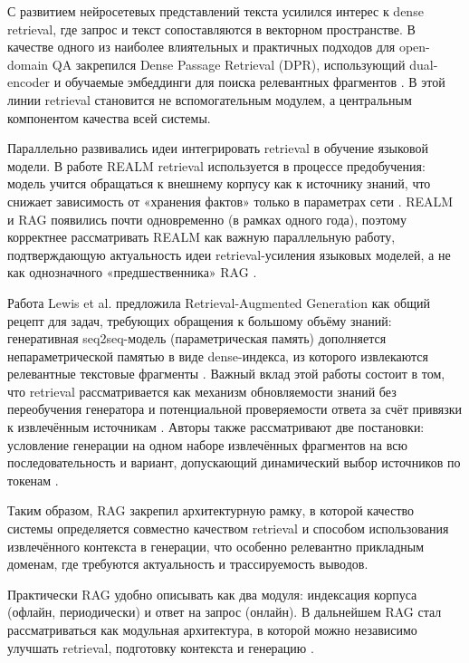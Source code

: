 \documentclass[a4paper,12pt]{article}
\begin{document}
С развитием нейросетевых представлений текста усилился интерес к dense retrieval, где запрос и текст сопоставляются в векторном пространстве. В качестве одного из наиболее влиятельных и практичных подходов для open-domain QA закрепился Dense Passage Retrieval (DPR), использующий dual-encoder и обучаемые эмбеддинги для поиска релевантных фрагментов \cite{karpukhin2020dpr}. В этой линии retrieval становится не вспомогательным модулем, а центральным компонентом качества всей системы.

Параллельно развивались идеи интегрировать retrieval в обучение языковой модели. В работе REALM retrieval используется в процессе предобучения: модель учится обращаться к внешнему корпусу как к источнику знаний, что снижает зависимость от «хранения фактов» только в параметрах сети \cite{guu2020realm}. REALM и RAG появились почти одновременно (в рамках одного года), поэтому корректнее рассматривать REALM как важную параллельную работу, подтверждающую актуальность идеи retrieval-усиления языковых моделей, а не как однозначного «предшественника» RAG \cite{guu2020realm,lewis2020rag}.

Работа Lewis et al. предложила Retrieval-Augmented Generation как общий рецепт для задач, требующих обращения к большому объёму знаний: генеративная seq2seq-модель (параметрическая память) дополняется непараметрической памятью в виде dense-индекса, из которого извлекаются релевантные текстовые фрагменты \cite{lewis2020rag}. Важный вклад этой работы состоит в том, что retrieval рассматривается как механизм обновляемости знаний без переобучения генератора и потенциальной проверяемости ответа за счёт привязки к извлечённым источникам \cite{lewis2020rag}. Авторы также рассматривают две постановки: условление генерации на одном наборе извлечённых фрагментов на всю последовательность и вариант, допускающий динамический выбор источников по токенам \cite{lewis2020rag}.

Таким образом, RAG закрепил архитектурную рамку, в которой качество системы определяется совместно качеством retrieval и способом использования извлечённого контекста в генерации, что особенно релевантно прикладным доменам, где требуются актуальность и трассируемость выводов.

Практически RAG удобно описывать как два модуля: индексация корпуса (офлайн, периодически) и ответ на запрос (онлайн). В дальнейшем RAG стал рассматриваться как модульная архитектура, в которой можно независимо улучшать retrieval, подготовку контекста и генерацию \cite{gao2023rag_survey}.
\end{document}
